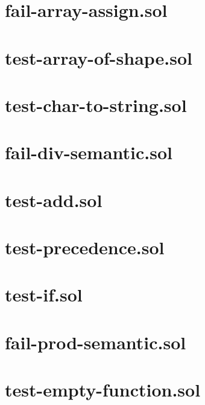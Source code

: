 \section{fail-array-assign.sol}


\section{test-array-of-shape.sol}


\section{test-char-to-string.sol}


\section{fail-div-semantic.sol}


\section{test-add.sol}


\section{test-precedence.sol}


\section{test-if.sol}


\section{fail-prod-semantic.sol}


\section{test-empty-function.sol}



